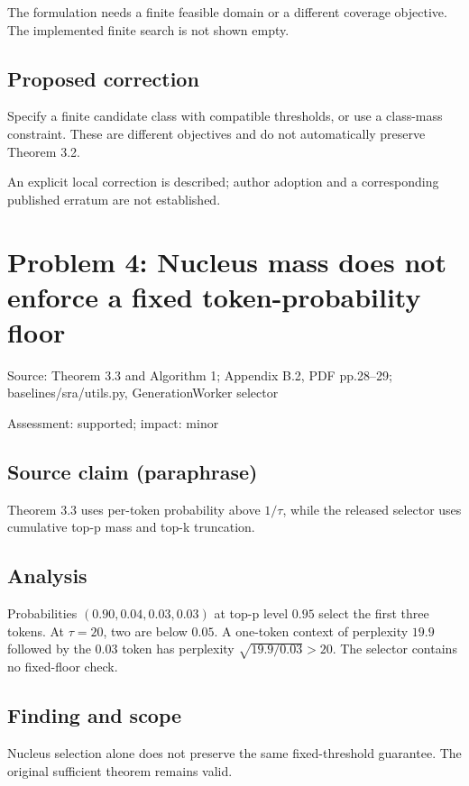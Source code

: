 \documentclass[11pt]{article}
\begin{document}
The formulation needs a finite feasible domain or a different coverage objective. The implemented finite search is not shown empty.

\subsection*{Proposed correction}

Specify a finite candidate class with compatible thresholds, or use a class-mass constraint. These are different objectives and do not automatically preserve Theorem 3.2.

An explicit local correction is described; author adoption and a corresponding published erratum are not established.

\section*{Problem 4: Nucleus mass does not enforce a fixed token-probability floor}

Source: Theorem 3.3 and Algorithm 1; Appendix B.2, PDF pp.28–29; baselines/sra/utils.py, GenerationWorker selector

Assessment: supported; impact: minor

\subsection*{Source claim (paraphrase)}

Theorem 3.3 uses per-token probability above \(1/\tau\), while the released selector uses cumulative top-p mass and top-k truncation.

\subsection*{Analysis}

Probabilities \((0.90,0.04,0.03,0.03)\) at top-p level \(0.95\) select the first three tokens. At \(\tau=20\), two are below \(0.05\). A one-token context of perplexity \(19.9\) followed by the \(0.03\) token has perplexity \(\sqrt{19.9/0.03}>20\). The selector contains no fixed-floor check.

\subsection*{Finding and scope}

Nucleus selection alone does not preserve the same fixed-threshold guarantee. The original sufficient theorem remains valid.
\end{document}
